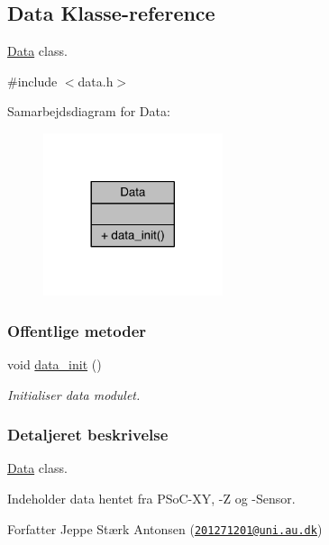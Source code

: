 \hypertarget{class_data}{}\subsection{Data Klasse-\/reference}
\label{class_data}


\hyperlink{class_data}{Data} class.  




{\ttfamily \#include $<$data.\+h$>$}



Samarbejdsdiagram for Data\+:
\nopagebreak
\begin{figure}[H]
\begin{center}
\leavevmode
\includegraphics[width=149pt]{da/d91/class_data__coll__graph}
\end{center}
\end{figure}
\subsubsection*{Offentlige metoder}
\begin{DoxyCompactItemize}
\item 
void \hyperlink{class_data_a68c6d4c829f9363c7d9ff2efbbca50c1}{data\+\_\+init} ()
\begin{DoxyCompactList}\small\item\em Initialiser data modulet. \end{DoxyCompactList}\end{DoxyCompactItemize}


\subsubsection{Detaljeret beskrivelse}
\hyperlink{class_data}{Data} class. 

Indeholder data hentet fra P\+So\+C-\/\+XY, -\/Z og -\/\+Sensor. \begin{DoxyAuthor}{Forfatter}
Jeppe Stærk Antonsen (\href{mailto:201271201@uni.au.dk}{\tt 201271201@uni.\+au.\+dk}) 
\end{DoxyAuthor}


